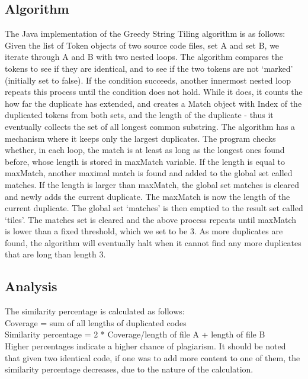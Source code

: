 \subsection{Algorithm}
The Java implementation of the Greedy String Tiling algorithm is as follows:
Given the list of Token objects of two source code files, set A and set B, we iterate through A and B with two nested loops. The algorithm compares the tokens to see if they are identical, and to see if the two tokens are not ‘marked’ (initially set to false). If the condition succeeds, another innermost nested loop repeats this process until the condition does not hold. While it does, it counts the how far the duplicate has extended, and creates a Match object with Index of the duplicated tokens from both sets, and the length of the duplicate - thus it eventually collects the set of all longest common substring.
The algorithm has a mechanism where it keeps only the largest duplicates. The program checks whether, in each loop, the match is at least as long as the longest ones found before, whose length is stored in maxMatch variable. If the length is equal to maxMatch, another maximal match is found and added to the global set called matches. If the length is larger than maxMatch, the global set matches is cleared and newly adds the current duplicate. The maxMatch is now the length of the current duplicate.
The global set ‘matches’ is then emptied to the result set called ‘tiles’. The matches set is cleared and the above process repeats until maxMatch is lower than a fixed threshold, which we set to be 3. As more duplicates are found, the algorithm will eventually halt when it cannot find any more duplicates that are long than length 3.

\subsection{Analysis}
The similarity percentage is calculated as follows:\\
 Coverage = sum of all lengths of duplicated codes\\
		Similarity percentage = 2 * Coverage/length of file A + length of file B\\

Higher percentages indicate a higher chance of plagiarism. It should be noted that given two identical code, if one was to add more content to one of them, the similarity percentage decreases, due to the nature of the calculation.

\break